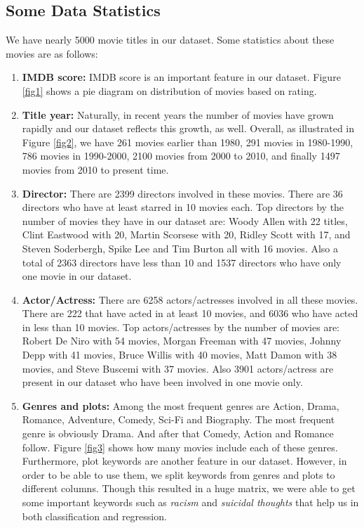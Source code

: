 \documentclass[journal,transmag]{IEEEtran}
\begin{document}
\subsection{Some Data Statistics}
We have nearly 5000 movie titles in our dataset. Some statistics about these movies are as follows:

\begin{enumerate}
\item{\textbf{IMDB score:}} IMDB score is an important feature in our dataset. Figure \ref{fig1} shows a pie diagram on distribution of movies based on rating.

\item{\textbf{Title year:}} Naturally, in recent years the number of movies have grown rapidly and our dataset reflects this growth, as well. Overall, as illustrated in Figure \ref{fig2}, we have 261 movies earlier than 1980, 291 movies in 1980-1990, 786 movies in 1990-2000, 2100 movies from 2000 to 2010, and finally 1497 movies from 2010 to present time.

\item{\textbf{Director:}} There are 2399 directors involved in these movies. There are 36 directors who have at least starred in 10 movies each. Top directors by the number of movies they have in our dataset are: Woody Allen with 22 titles, Clint Eastwood with 20, Martin Scorsese with 20, Ridley Scott with 17, and Steven Soderbergh, Spike Lee and Tim Burton all with 16 movies. Also a total of 2363 directors have less than 10 and 1537 directors who have only one movie in our dataset.

\item{\textbf{Actor/Actress:}} There are 6258 actors/actresses involved in all these movies. There are 222 that have acted in at least 10 movies, and 6036 who have acted in less than 10 movies. Top actors/actresses by the number of movies are: Robert De Niro with 54 movies, Morgan Freeman with 47 movies, Johnny Depp with 41 movies, Bruce Willis with 40 movies, Matt Damon with 38 movies, and Steve Buscemi with 37 movies. Also 3901 actors/actress are present in our dataset who have been involved in one movie only.

\item{\textbf{Genres and plots:}} Among the most frequent genres are Action, Drama, Romance, Adventure, Comedy, Sci-Fi and Biography. The most frequent genre is obviously Drama. And after that Comedy, Action and Romance follow. Figure \ref{fig3} shows how many movies include each of these genres. Furthermore, plot keywords are another feature in our dataset. However, in order to be able to use them, we split keywords from genres and plots to different columns. Though this resulted in a huge matrix, we were able to get some important keywords such as \emph{racism} and \emph{suicidal thoughts} that help us in both classification and regression.


\end{enumerate}
\end{document}

